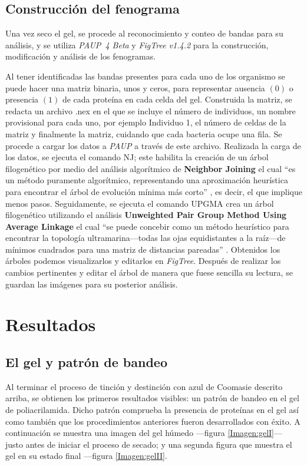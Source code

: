 \documentclass[%
 reprint,
 amsmath,amssymb,
 aps,
showkeys,
letter,
12pts
]{revtex4-1}
\begin{document}
	\subsection{\label{sec:Fen}Construcción del fenograma}\cite{metodos}
		Una vez seco el gel, se procede al reconocimiento y conteo de bandas para su análisis, y se utiliza \textit{PAUP\ 4 Beta} y \textit{FigTree v1.4.2} para la construcción, modificación y análisis de los fenogramas.
		
		Al tener identificadas las bandas presentes para cada uno de los organismo se puede hacer una matriz binaria, unos y ceros, para representar ausencia $\left(0\right)$ o presencia $\left(1\right)$ de cada proteína en cada celda del gel. Construida la matriz, se redacta un archivo .nex en el que se incluye el número de individuos, un nombre provisional para cada uno, por ejemplo Individuo 1, el número de celdas de la matriz y finalmente la matriz, cuidando que cada bacteria ocupe una fila. Se procede a cargar los datos a \textit{PAUP} a través de este archivo. Realizada la carga de los datos, se ejecuta el comando NJ; este habilita la creación de un árbol filogenético por medio del análisis algorítmico de \textbf{Neighbor Joining} el cual “es un método puramente algorítmico, representando una aproximación heurística para encontrar el árbol de evolución mínima más corto” \cite{metodos}, es decir, el que implique menos pasos. Seguidamente, se ejecuta el comando UPGMA crea un árbol filogenético utilizando el análisis \textbf{Unweighted Pair Group Method Using Average Linkage} el cual “se puede concebir como un método heurístico para encontrar la topología ultramarina---todas las ojas equidistantes a la raíz---de mínimos cuadrados para una matriz de distancias pareadas” \cite{metodos}. Obtenidos los árboles podemos visualizarlos y editarlos en \textit{FigTree}. Después de realizar los cambios pertinentes y editar el árbol de manera que fuese sencilla su lectura, se guardan las imágenes para su posterior análisis.	
	
\section{\label{sec:Resul}Resultados} %
	\subsection{El gel y patrón de bandeo}
		Al terminar el proceso de tinción y destinción con azul de Coomasie descrito arriba, se obtienen los primeros resultados visibles: un patrón de bandeo en el gel de poliacrilamida. Dicho patrón comprueba la presencia de proteínas en el gel así como también que los procedimientos anteriores fueron desarrollados con éxito. A continuación se muestra una imagen del gel húmedo ---figura \ref{Imagen:gelI}--- justo antes de iniciar el proceso de secado; y una segunda figura que muestra el gel en su estado final ---figura \ref{Imagen:gelII}.
		
\end{document}
